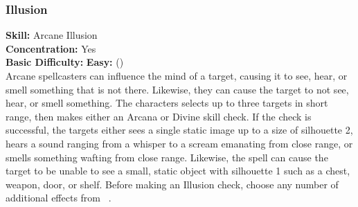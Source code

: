 \subsubsection{Illusion}
\textbf{Skill:} Arcane Illusion\\
\textbf{Concentration:} Yes\\
\textbf{Basic Difficulty:} \textbf{Easy:} (\difficulty)\\
Arcane spellcasters can influence the mind of a target, causing
it to see, hear, or smell something that is not there. Likewise, they can cause
the target to not see, hear, or smell something.  The characters selects up to
three targets in short range, then makes either an Arcana or Divine skill check.
If the check is successful, the targets either sees a single static image up to
a size of silhouette 2, hears a sound ranging from a whisper to a scream emanating
from close range, or smells something wafting from close range. Likewise, the spell
can cause the target to be unable to see a small, static object with silhouette 1
such as a chest, weapon, door, or shelf. Before making an Illusion check, choose
any number of additional effects from ~.
